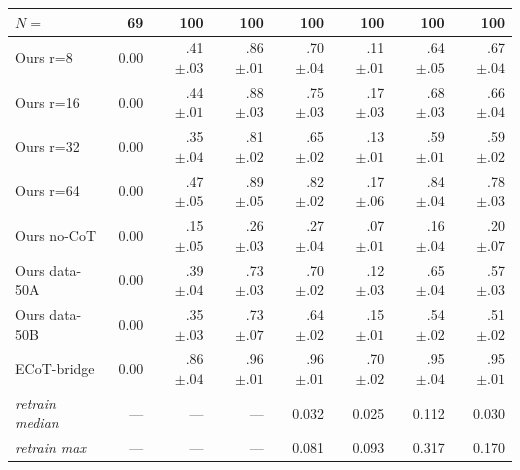 \begin{table}[t]
\begin{tabular}{l r r r r r r r}
$N=$ & 69 & 100 & 100 & 100 & 100 & 100 & 100 \\
\midrule
Ours r=8       & 0.00 & .41\tiny{$\pm .03$} & .86\tiny{$\pm .01$} & .70\tiny{$\pm .04$} & .11\tiny{$\pm .01$} & .64\tiny{$\pm .05$} & .67\tiny{$\pm .04$} \\
Ours r=16      & 0.00 & .44\tiny{$\pm .01$} & .88\tiny{$\pm .03$} & .75\tiny{$\pm .03$} & .17\tiny{$\pm .03$} & .68\tiny{$\pm .03$} & .66\tiny{$\pm .04$} \\
Ours r=32      & 0.00 & .35\tiny{$\pm .04$} & .81\tiny{$\pm .02$} & .65\tiny{$\pm .02$} & .13\tiny{$\pm .01$} & .59\tiny{$\pm .01$} & .59\tiny{$\pm .02$} \\
Ours r=64      & 0.00 & .47\tiny{$\pm .05$} & .89\tiny{$\pm .05$} & .82\tiny{$\pm .02$} & .17\tiny{$\pm .06$} & .84\tiny{$\pm .04$} & .78\tiny{$\pm .03$} \\
Ours no-CoT    & 0.00 & .15\tiny{$\pm .05$} & .26\tiny{$\pm .03$} & .27\tiny{$\pm .04$} & .07\tiny{$\pm .01$} & .16\tiny{$\pm .04$} & .20\tiny{$\pm .07$} \\
Ours data-50A  & 0.00 & .39\tiny{$\pm .04$} & .73\tiny{$\pm .03$} & .70\tiny{$\pm .02$} & .12\tiny{$\pm .03$} & .65\tiny{$\pm .04$} & .57\tiny{$\pm .03$} \\
Ours data-50B  & 0.00 & .35\tiny{$\pm .03$} & .73\tiny{$\pm .07$} & .64\tiny{$\pm .02$} & .15\tiny{$\pm .01$} & .54\tiny{$\pm .02$} & .51\tiny{$\pm .02$} \\
ECoT-bridge & 0.00 & .86\tiny{$\pm .04$} & .96\tiny{$\pm .01$} & .96\tiny{$\pm .01$} & .70\tiny{$\pm .02$} & .95\tiny{$\pm .04$} & .95\tiny{$\pm .01$} \\
\midrule
\emph{retrain median} & --- & --- & --- & 0.032 & 0.025 & 0.112 & 0.030 \\
\emph{retrain max}    & --- & --- & --- & 0.081 & 0.093 & 0.317 & 0.170 \\
\bottomrule
\end{tabular}
\end{table}

